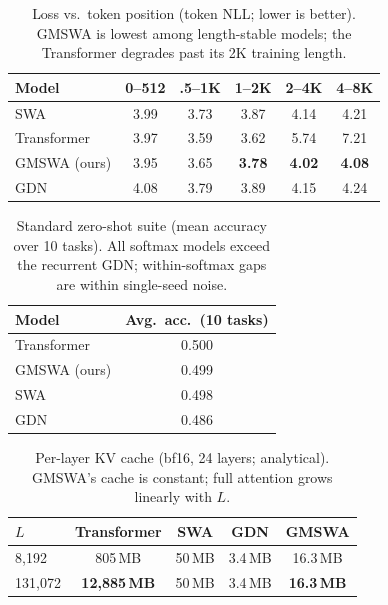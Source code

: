 \documentclass[letterpaper]{article} %
\begin{document}
\begin{table}[t]\centering\small
\caption{Loss vs.\ token position (token NLL; lower is better). GMSWA is lowest among length-stable models; the Transformer degrades past its 2K training length.}
\label{tab:loss}
\begin{tabular}{lccccc}
\toprule
Model & 0--512 & .5--1K & 1--2K & 2--4K & 4--8K \\
\midrule
SWA & 3.99 & 3.73 & 3.87 & 4.14 & 4.21 \\
Transformer & 3.97 & 3.59 & 3.62 & 5.74 & 7.21 \\
GMSWA (ours) & 3.95 & 3.65 & \textbf{3.78} & \textbf{4.02} & \textbf{4.08} \\
GDN & 4.08 & 3.79 & 3.89 & 4.15 & 4.24 \\
\bottomrule
\end{tabular}
\end{table}

\begin{table}[t]\centering\small
\caption{Standard zero-shot suite (mean accuracy over 10 tasks). All softmax models exceed the recurrent GDN; within-softmax gaps are within single-seed noise.}
\label{tab:zs}
\begin{tabular}{lc}
\toprule
Model & Avg.\ acc.\ (10 tasks) \\
\midrule
Transformer & 0.500 \\
GMSWA (ours) & 0.499 \\
SWA & 0.498 \\
GDN & 0.486 \\
\bottomrule
\end{tabular}
\end{table}

\begin{table}[t]\centering\small
\caption{Per-layer KV cache (bf16, 24 layers; analytical). GMSWA's cache is constant; full attention grows linearly with $L$.}
\label{tab:cache}
\begin{tabular}{lcccc}
\toprule
$L$ & Transformer & SWA & GDN & GMSWA \\
\midrule
8{,}192 & 805\,MB & 50\,MB & 3.4\,MB & 16.3\,MB \\
131{,}072 & \textbf{12{,}885\,MB} & 50\,MB & 3.4\,MB & \textbf{16.3\,MB} \\
\bottomrule
\end{tabular}
\end{table}
\end{document}
